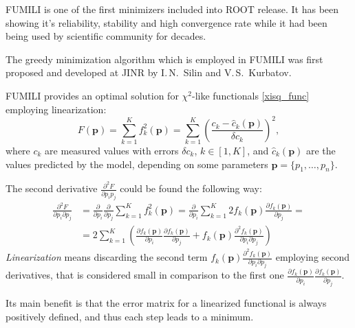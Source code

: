 
FUMILI is one of the first minimizers included into ROOT release.
It has been showing it's reliability, stability and high convergence rate while it had been being used by scientific community for decades.

The greedy minimization algorithm which is employed in FUMILI was first proposed and developed at JINR by I.\,N.~Silin and V.\,S.~Kurbatov.

FUMILI provides an optimal solution for $\chi^2$-like functionals \eqref{xisq_func} employing linearization:
\begin{equation}
\label{xisq_func}
F(\boldsymbol{p}) = \sum_{k=1}^K f_k^2(\boldsymbol{p}) = \sum_{k=1}^K\left(\frac{c_k - \hat{c}_k(\boldsymbol{p})}{\delta c_k} \right)^2,
\end{equation}
where $c_k$ are measured values with errors $\delta c_k$, $k \in [1, K]$, and $\hat{c}_k(\boldsymbol{p})$ are the values predicted by the model, depending on some parameters $\boldsymbol{p} = \{p_1, \ldots, p_n\}$.

The second derivative $\displaystyle\frac{\partial^2 F}{\partial p_i p_j}$ could be found the following way:
\begin{equation}
\begin{aligned}
\frac{\partial^2 F}{\partial p_i \partial p_j} &= \frac{\partial}{\partial p_i}\frac{\partial}{\partial p_j} \sum_{k=1}^K f_k^2(\boldsymbol{p}) = \frac{\partial}{\partial p_i}\sum_{k=1}^K 2 f_k(\boldsymbol{p}) \frac{\partial f_k(\boldsymbol{p})}{\partial p_j} = \\
&= 2 \sum_{k=1}^K \left( \frac{\partial f_k(\boldsymbol{p})}{\partial p_i}\frac{\partial f_k(\boldsymbol{p})}{\partial p_j} + f_k(\boldsymbol{p}) \frac{\partial^2 f_k(\boldsymbol{p})}{\partial p_i \partial p_j} \right)
\end{aligned}
\end{equation}
\emph{Linearization} means discarding the second term $\displaystyle f_k(\boldsymbol{p})\frac{\partial^2 f_k(\boldsymbol{p})}{\partial p_i \partial p_j}$ employing second derivatives, that is considered small in comparison to the first one $\displaystyle\frac{\partial f_k(\boldsymbol{p})}{\partial p_i}\frac{\partial f_k(\boldsymbol{p})}{\partial p_j}$.

Its main benefit is that the error matrix for a linearized functional is always positively defined, and thus each step leads to a minimum.

